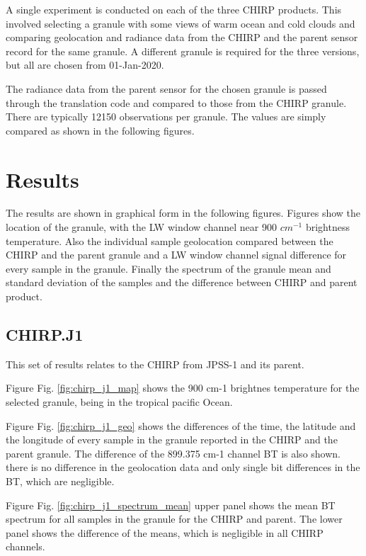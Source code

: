 \documentclass[11pt]{article}
\begin{document}
A single experiment is conducted on each of the three CHIRP products. This involved
selecting a granule with some views of warm ocean and cold clouds and comparing geolocation
and radiance data from the CHIRP and the parent sensor record for the same granule.
A different granule is required for the three versions, but all are chosen from 
01-Jan-2020.

The radiance data from the parent sensor for the chosen granule is passed through the
translation code and compared to those from the CHIRP granule. There are typically 12150
observations per granule. The values are simply compared as shown in the following figures.

\section{Results}
\label{sec:orgba76714}

The results are shown in graphical form in the following figures. 
Figures show the location of the granule, with the LW window channel near 900 \(cm^{-1}\) 
brightness temperature.
Also the individual sample geolocation compared between the CHIRP and the parent granule
and a LW window channel signal difference for every sample in the granule.
Finally the spectrum of the granule mean and standard deviation of the samples and
the difference between CHIRP and parent product. 

\subsection{CHIRP.J1}
\label{sec:orge1203c5}

This set of results relates to the CHIRP from JPSS-1 and its parent.

Figure Fig. \ref{fig:chirp_j1_map} shows the 900 cm-1 brightnes temperature for the selected granule, being in the tropical pacific Ocean.

Figure Fig. \ref{fig:chirp_j1_geo} shows the differences of the time, the latitude and the longitude of every sample in the granule  reported in the CHIRP and the parent granule. The difference of the 899.375 cm-1 channel BT is also shown. there is no difference in the geolocation data and only single bit differences in the BT, which are negligible.

Figure Fig. \ref{fig:chirp_j1_spectrum_mean} upper panel shows the mean BT spectrum for all samples in the granule for the CHIRP and parent. The lower panel shows the difference of the means, which is negligible in all CHIRP channels.
\end{document}
